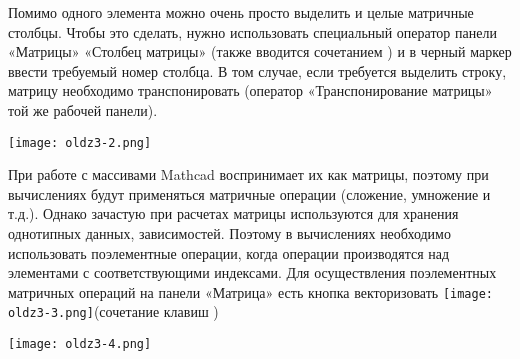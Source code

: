 Помимо одного элемента можно очень просто выделить и целые матричные столбцы. Чтобы это сделать, нужно использовать специальный оператор панели «Матрицы» «Столбец матрицы» (также вводится сочетанием  )  и в черный маркер ввести требуемый номер столбца. В том случае, если требуется выделить строку, матрицу необходимо транспонировать (оператор «Транспонирование матрицы» той же рабочей панели).


\begin{center}
	\texttt{[image: oldz3-2.png]}
\end{center}


При работе с массивами Mathcad воспринимает их как матрицы, поэтому при вычислениях будут применяться матричные операции (сложение, умножение и т.д.). Однако зачастую при расчетах матрицы используются для хранения однотипных данных, зависимостей. Поэтому в вычислениях необходимо использовать поэлементные операции, когда операции производятся над элементами с соответствующими индексами. Для осуществления поэлементных матричных операций на панели  «Матрица» есть кнопка векторизовать  \texttt{[image: oldz3-3.png]}(сочетание клавиш \keys{\ctrl + -})


\begin{center}
	\texttt{[image: oldz3-4.png]}
\end{center}



